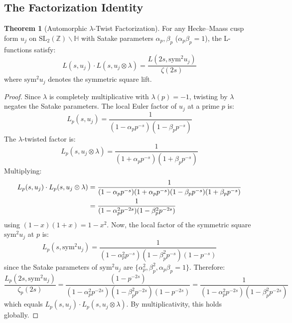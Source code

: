 \documentclass[11pt,a4paper]{article}
\theoremstyle{definition}
\newtheorem{theorem}{Theorem}[section]
\newcommand{\SL}{\mathrm{SL}}
\newcommand{\Sym}{\mathrm{sym}}
\begin{document}
\subsection{The Factorization Identity}

\begin{theorem}[Automorphic $\lambda$-Twist Factorization]
\label{thm:lambda-twist}
For any Hecke--Maass cusp form $u_j$ on $\SL_2(\mathbb{Z})\backslash\mathbb{H}$ with Satake parameters $\alpha_p, \beta_p$ ($\alpha_p\beta_p = 1$), the L-functions satisfy:
\begin{equation}
L(s, u_j) \cdot L(s, u_j \otimes \lambda) = \frac{L(2s, \Sym^2 u_j)}{\zeta(2s)}
\end{equation}
where $\Sym^2 u_j$ denotes the symmetric square lift.
\end{theorem}

\begin{proof}
Since $\lambda$ is completely multiplicative with $\lambda(p) = -1$, twisting by $\lambda$ negates the Satake parameters. The local Euler factor of $u_j$ at a prime $p$ is:
\begin{equation}
L_p(s, u_j) = \frac{1}{(1 - \alpha_p p^{-s})(1 - \beta_p p^{-s})}
\end{equation}
The $\lambda$-twisted factor is:
\begin{equation}
L_p(s, u_j \otimes \lambda) = \frac{1}{(1 + \alpha_p p^{-s})(1 + \beta_p p^{-s})}
\end{equation}
Multiplying:
\begin{align}
L_p(s, u_j) \cdot L_p(s, u_j \otimes \lambda) &= \frac{1}{(1-\alpha_p p^{-s})(1+\alpha_p p^{-s})(1-\beta_p p^{-s})(1+\beta_p p^{-s})} \notag \\
&= \frac{1}{(1-\alpha_p^2 p^{-2s})(1-\beta_p^2 p^{-2s})}
\end{align}
using $(1-x)(1+x) = 1-x^2$. Now, the local factor of the symmetric square $\Sym^2 u_j$ at $p$ is:
\begin{equation}
L_p(s, \Sym^2 u_j) = \frac{1}{(1-\alpha_p^2 p^{-s})(1-\beta_p^2 p^{-s})(1-p^{-s})}
\end{equation}
since the Satake parameters of $\Sym^2 u_j$ are $\{\alpha_p^2, \beta_p^2, \alpha_p\beta_p = 1\}$. Therefore:
\begin{equation}
\frac{L_p(2s, \Sym^2 u_j)}{\zeta_p(2s)} = \frac{(1-p^{-2s})}{(1-\alpha_p^2 p^{-2s})(1-\beta_p^2 p^{-2s})(1-p^{-2s})} = \frac{1}{(1-\alpha_p^2 p^{-2s})(1-\beta_p^2 p^{-2s})}
\end{equation}
which equals $L_p(s,u_j) \cdot L_p(s, u_j \otimes \lambda)$. By multiplicativity, this holds globally.
\end{proof}
\end{document}
